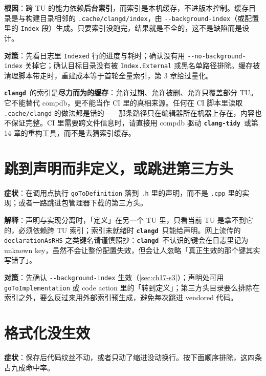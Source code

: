 \documentclass[12pt,a4paper,fontset=fandol]{ctexbook}
\newcommand{\Opt}[1]{\texttt{-\/-#1}}
\newcommand{\Lib}[1]{\textbf{\texttt{#1}}}
\newcommand{\Tidy}{\Lib{clang-tidy}}
\newcommand{\CD}{\Lib{clangd}}
\begin{document}
\textbf{根因}：跨 TU 的能力依赖\textbf{后台索引}，而索引是本机缓存，不进版本控制。缓存目录是与构建目录相邻的 \texttt{.cache/clangd/index}，由 \Opt{background-index}（或配置里的 \texttt{Index} 段）生成。只要索引没跑完，结果就是不全的，这不是缺陷而是设计。

\textbf{对策}：先看日志里 \texttt{Indexed} 行的进度与耗时；确认没有用 \Opt{no-background-index} 关掉它；确认目标目录没有被 \texttt{Index.External} 或黑名单路径排除。缓存被清理脚本带走时，重建成本等于首轮全量索引，第 3 章给过量化。

\begin{warning}[title={后台索引不是数据库}]
\CD\ 的索引是\textbf{尽力而为的缓存}：允许过期、允许被删、允许只覆盖部分 TU。它不能替代 compdb，更不能当作 CI 里的真相来源。任何在 CI 脚本里读取 \texttt{.cache/clangd} 的做法都是错的——那条路径只在编辑器所在机器上存在，内容也不保证完整。CI 里需要跨文件信息时，请直接用 compdb 驱动 \Tidy\ 或第 14 章的重构工具，而不是去猜索引缓存。
\end{warning}

\section{跳到声明而非定义，或跳进第三方头}\label{sec:ch17-s4}

\textbf{症状}：在调用点执行 \texttt{goToDefinition} 落到 \texttt{.h} 里的声明，而不是 \texttt{.cpp} 里的实现；或者一路跳进包管理器下载的第三方头。

\textbf{解释}：声明与实现分离时，「定义」在另一个 TU 里，只看当前 TU 是拿不到它的，必须依赖跨 TU 索引；索引未就绪时 \CD\ 只能给声明。网上流传的 \texttt{declarationAsRHS} 之类键名请谨慎照抄：\CD\ 不认识的键会在日志里记为 unknown key，虽然不会让整份配置失效，但会让人忽略「真正生效的那个键其实写错了」。

\textbf{对策}：先确认 \Opt{background-index} 生效（\ref{sec:ch17-s3}）；声明处可用 \texttt{goToImplementation} 或 code action 里的「转到定义」；第三方头目录要么排除在索引之外，要么反过来用外部索引预生成，避免每次跳进 vendored 代码。

\section{格式化没生效}\label{sec:ch17-s5}

\textbf{症状}：保存后代码纹丝不动，或者只动了缩进没动换行。按下面顺序排除，这四条占九成命中率。
\end{document}
